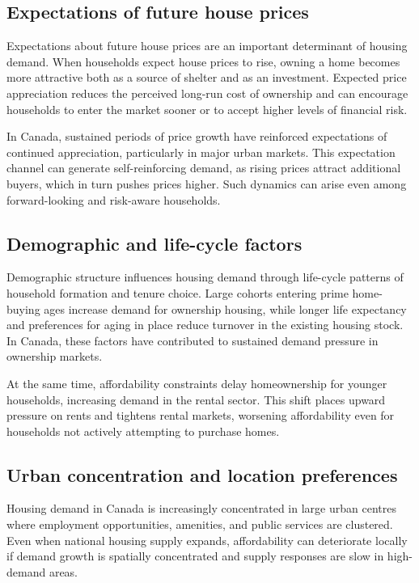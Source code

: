 \documentclass[11pt]{article}
\begin{document}
\subsection*{Expectations of future house prices}

Expectations about future house prices are an important determinant of housing demand. When households expect house prices to rise, owning a home becomes more attractive both as a source of shelter and as an investment. Expected price appreciation reduces the perceived long-run cost of ownership and can encourage households to enter the market sooner or to accept higher levels of financial risk.

In Canada, sustained periods of price growth have reinforced expectations of continued appreciation, particularly in major urban markets. This expectation channel can generate self-reinforcing demand, as rising prices attract additional buyers, which in turn pushes prices higher. Such dynamics can arise even among forward-looking and risk-aware households.

\subsection*{Demographic and life-cycle factors}

Demographic structure influences housing demand through life-cycle patterns of household formation and tenure choice. Large cohorts entering prime home-buying ages increase demand for ownership housing, while longer life expectancy and preferences for aging in place reduce turnover in the existing housing stock. In Canada, these factors have contributed to sustained demand pressure in ownership markets.

At the same time, affordability constraints delay homeownership for younger households, increasing demand in the rental sector. This shift places upward pressure on rents and tightens rental markets, worsening affordability even for households not actively attempting to purchase homes.

\subsection*{Urban concentration and location preferences}

Housing demand in Canada is increasingly concentrated in large urban centres where employment opportunities, amenities, and public services are clustered. Even when national housing supply expands, affordability can deteriorate locally if demand growth is spatially concentrated and supply responses are slow in high-demand areas.
\end{document}
